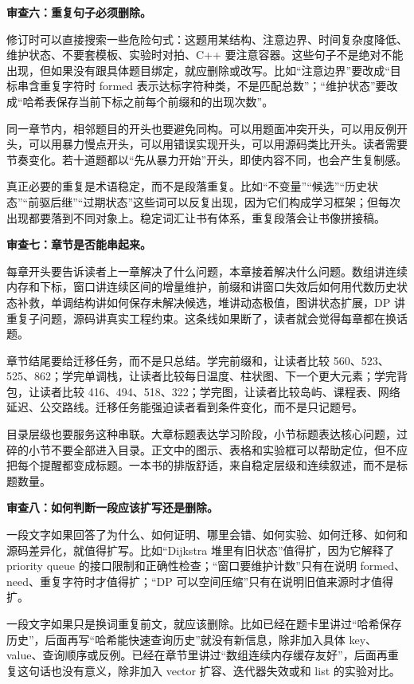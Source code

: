\noindent\textbf{审查六：重复句子必须删除。}

修订时可以直接搜索一些危险句式：这题用某结构、注意边界、时间复杂度降低、维护状态、不要套模板、实验时对拍、C++ 要注意容器。这些句子不是绝对不能出现，但如果没有跟具体题目绑定，就应删除或改写。比如“注意边界”要改成“目标串含重复字符时 formed 表示达标字符种类，不是匹配总数”；“维护状态”要改成“哈希表保存当前下标之前每个前缀和的出现次数”。

同一章节内，相邻题目的开头也要避免同构。可以用题面冲突开头，可以用反例开头，可以用暴力慢点开头，可以用错误实现开头，可以用源码类比开头。读者需要节奏变化。若十道题都以“先从暴力开始”开头，即使内容不同，也会产生复制感。

真正必要的重复是术语稳定，而不是段落重复。比如“不变量”“候选”“历史状态”“前驱后继”“过期状态”这些词可以反复出现，因为它们构成学习框架；但每次出现都要落到不同对象上。稳定词汇让书有体系，重复段落会让书像拼接稿。

\noindent\textbf{审查七：章节是否能串起来。}

每章开头要告诉读者上一章解决了什么问题，本章接着解决什么问题。数组讲连续内存和下标，窗口讲连续区间的增量维护，前缀和讲窗口失效后如何用代数历史状态补救，单调结构讲如何保存未解决候选，堆讲动态极值，图讲状态扩展，DP 讲重复子问题，源码讲真实工程约束。这条线如果断了，读者就会觉得每章都在换话题。

章节结尾要给迁移任务，而不是只总结。学完前缀和，让读者比较 560、523、525、862；学完单调栈，让读者比较每日温度、柱状图、下一个更大元素；学完背包，让读者比较 416、494、518、322；学完图，让读者比较岛屿、课程表、网络延迟、公交路线。迁移任务能强迫读者看到条件变化，而不是只记题号。

目录层级也要服务这种串联。大章标题表达学习阶段，小节标题表达核心问题，过碎的小节不要全部进入目录。正文中的图示、表格和实验框可以帮助定位，但不应把每个提醒都变成标题。一本书的排版舒适，来自稳定层级和连续叙述，而不是标题数量。

\noindent\textbf{审查八：如何判断一段应该扩写还是删除。}

一段文字如果回答了为什么、如何证明、哪里会错、如何实验、如何迁移、如何和源码差异化，就值得扩写。比如“Dijkstra 堆里有旧状态”值得扩，因为它解释了 priority queue 的接口限制和正确性检查；“窗口要维护计数”只有在说明 formed、need、重复字符时才值得扩；“DP 可以空间压缩”只有在说明旧值来源时才值得扩。

一段文字如果只是换词重复前文，就应该删除。比如已经在题卡里讲过“哈希保存历史”，后面再写“哈希能快速查询历史”就没有新信息，除非加入具体 key、value、查询顺序或反例。已经在章节里讲过“数组连续内存缓存友好”，后面再重复这句话也没有意义，除非加入 vector 扩容、迭代器失效或和 list 的实验对比。

